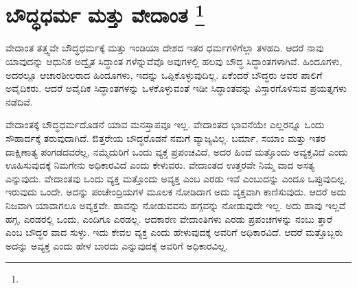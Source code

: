 
\chapter[ಬೌದ್ಧಧರ್ಮ ಮತ್ತು ವೇದಾಂತ ]{ಬೌದ್ಧಧರ್ಮ ಮತ್ತು ವೇದಾಂತ \protect\footnote{}}

ವೇದಾಂತ ತತ್ತ್ವವೇ ಬೌದ್ಧಧರ್ಮಕ್ಕೆ ಮತ್ತು ಇಂಡಿಯಾ ದೇಶದ ಇತರ ಧರ್ಮಗಳಿಗೆಲ್ಲಾ ತಳಹದಿ. ಆದರೆ ನಾವು ಯಾವುದನ್ನು ಆಧುನಿಕ ಅದ್ವೈತ ಸಿದ್ಧಾಂತ ಗಳೆನ್ನುವೆವೊ ಅವುಗಳಲ್ಲಿ ಹಲವು ಬೌದ್ಧ ಸಿದ್ಧಾಂತಗಳಾಗಿವೆ. ಹಿಂದೂಗಳು, ಅದರಲ್ಲೂ ಆಚಾರಶೀಲರಾದ ಹಿಂದೂಗಳು, ಇದನ್ನು ಒಪ್ಪಿಕೊಳ್ಳುವುದಿಲ್ಲ. ಏಕೆಂದರೆ ಬೌದ್ಧರು ಅವರ ಪಾಲಿಗೆ ಅವೈದಿಕರು. ಆದರೆ ಅವೈದಿಕ ಸಿದ್ಧಾಂತಗಳನ್ನು ಒಳಕೊಳ್ಳುವಂತೆ ಇಡೀ ಸಿದ್ಧಾಂತವನ್ನು ವಿಸ್ತಾರಗೊಳಿಸುವ ಪ್ರಯತ್ನಗಳು ನಡೆದಿವೆ.

ವೇದಾಂತಕ್ಕೆ ಬೌದ್ಧಧರ್ಮದೊಡನೆ ಯಾವ ಮನಸ್ತಾಪವೂ ಇಲ್ಲ. ವೇದಾಂತದ ಭಾವನೆಯೇ ಎಲ್ಲರನ್ನೂ ಒಂದು ಸೌಹಾರ್ದಕ್ಕೆ ತರುವುದಾಗಿದೆ. ಔತ್ತರೇಯ ಬೌದ್ಧರೊಡನೆ ನಮಗೆ ವ್ಯಾಜ್ಯವಿಲ್ಲ. ಬರ್ಮಾ, ಸಯಾಂ ಮತ್ತು ಇತರ ದಾಕ್ಷಿಣಾತ್ಯ ಪಂಗಡದವರೆಲ್ಲ, ನಮ್ಮೆದುರಿಗೆ ಒಂದು ವ್ಯಕ್ತ ಪ್ರಪಂಚವಿದೆ, ಅದರ ಹಿಂದೆ ಮತ್ತೊಂದು ಅವ್ಯಕ್ತವಿದೆ ಎಂದು ಊಹಿಸುವುದಕ್ಕೆ ನಿಮಗೇನು ಅಧಿಕಾರವಿದೆ ಎಂದು ಕೇಳುವರು. ವೇದಾಂತದ ಉತ್ತರವೇ ನಿಮ್ಮ ವಾದ ಅಸತ್ಯ ಎನ್ನುವುದು. ವೇದಾಂತವು ಒಂದು ವ್ಯಕ್ತ ಮತ್ತೊಂದು ಅವ್ಯಕ್ತ ಎಂಬ ಎರಡು ಇವೆ ಎಂಬುದನ್ನು ಎಂದೂ ಒಪ್ಪುವುದಿಲ್ಲ. ಇರುವುದು ಒಂದೇ. ಅದನ್ನು ಪಂಚೇಂದ್ರಿಯಗಳ ಮೂಲಕ ನೋಡಿದಾಗ ಅದು ವ್ಯಕ್ತವಾಗಿ ಕಾಣಿಸುವುದು. ಆದರೆ ಅದು ನಿಜವಾಗಿ ಯಾವಾಗಲೂ ಅವ್ಯಕ್ತವೇ. ಹಾವನ್ನು ನೋಡುವವನು ಹಗ್ಗವನ್ನು ನೋಡುವುದೇ ಇಲ್ಲ. ಅದು ಹಾವು ಇಲ್ಲವೆ ಹಗ್ಗ, ಎರಡರಲ್ಲಿ ಒಂದು, ಎಂದಿಗೂ ಎರಡಲ್ಲ. ಆದಕಾರಣ ವೇದಾಂತಿಗಳು ಎರಡು ಪ್ರಪಂಚಗಳನ್ನು ನಂಬು ತ್ತಾರೆ ಎಂಬ ಬೌದ್ಧರ ವಾದ ಸುಳ್ಳು. ಇದು ಕೇವಲ ವ್ಯಕ್ತ ಎಂದು ಹೇಳುವುದಕ್ಕೆ ಅವರಿಗೆ ಅಧಿಕಾರವಿದೆ. ಆದರೆ ಮತ್ತೊಬ್ಬರು ಅದನ್ನು ಅವ್ಯಕ್ತ ಎಂದು ಹೇಳ ಬಾರದು ಎನ್ನುವುದಕ್ಕೆ ಅವರಿಗೆ ಅಧಿಕಾರವಿಲ್ಲ.

